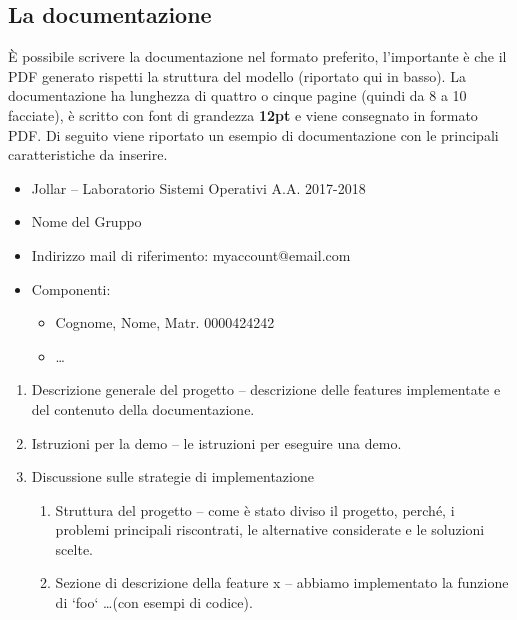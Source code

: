 \subsection{La documentazione}
È possibile scrivere la documentazione nel formato preferito, l'importante è che il PDF generato rispetti la struttura del modello (riportato qui in basso). La documentazione ha lunghezza di quattro o cinque pagine (quindi da 8 a 10 facciate), è scritto con font di grandezza \textbf{12pt} e viene consegnato in formato PDF. 
Di seguito viene riportato un esempio di documentazione con le principali caratteristiche da inserire.
\begin{tcolorbox}[colback=green!20!white,colframe=green!75!black,title=L'intestazione della Documentazione]
\begin{itemize}
    \item Jollar -- Laboratorio Sistemi Operativi A.A. 2017-2018
    \item Nome del Gruppo
    \item Indirizzo mail di riferimento: myaccount@email.com
    \item Componenti:
    \begin{itemize}
        \item Cognome, Nome, Matr. 0000424242
        \item \dots
    \end{itemize}
\end{itemize}
\end{tcolorbox}
\begin{tcolorbox}[colback=green!20!white,colframe=green!75!black,title=Il corpo della Documentazione]
\begin{enumerate}
    \item Descrizione generale del progetto -- descrizione delle features implementate e del contenuto della documentazione.
    \item Istruzioni per la demo -- le istruzioni per eseguire una demo.
    \item Discussione sulle strategie di implementazione 
    \begin{enumerate}
        \item Struttura del progetto -- come è stato diviso il progetto, perché, i problemi principali riscontrati, le alternative considerate e le soluzioni scelte.
        \item Sezione di descrizione della feature x -- abbiamo implementato la funzione di `foo` \dots (con esempi di codice).
    \end{enumerate}
\end{enumerate}
\end{tcolorbox}

